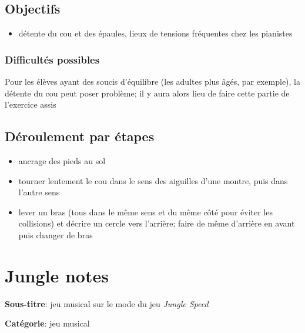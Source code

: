 \documentclass[a4paper,11pt,bibliography=totoc,numbers=noenddot,listof=flat,DIV=11,BCOR=0mm]{scrreprt}%
\begin{document}
\section*{Objectifs}
\begin{itemize}
\item détente du cou et des épaules, lieux de tensions fréquentes chez les pianistes
\end{itemize}

\subsection*{Difficultés possibles}
Pour les élèves ayant des soucis d'équilibre (les adultes plus âgés, par exemple), la détente du cou peut poser problème; il y aura alors lieu de faire cette partie de l'exercice assis

\section*{Déroulement par étapes}
\begin{itemize}
\item ancrage des pieds au sol
\item tourner lentement le cou dans le sens des aiguilles d'une montre, puis dans l'autre sens
\item lever un bras (tous dans le même sens et du même côté pour éviter les collisions) et décrire un cercle vers l'arrière; faire de même d'arrière en avant puis changer de bras
\end{itemize}



\chapter[Jeu musical: Jungle notes]{Jungle notes}


{\large \textbf{Sous-titre}}:
 jeu musical sur le mode du jeu \emph{Jungle Speed}

{\large \textbf{Catégorie}}:
jeu musical
\end{document}
